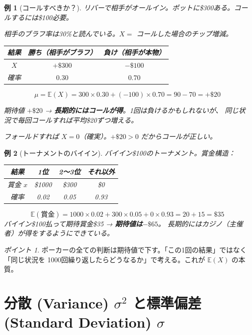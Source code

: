 \documentclass{article}
\newcommand{\E}{\mathbb{E}}
\newtheorem{example}{例}[section]
\theoremstyle{remark}
\newtheorem*{point}{ポイント}
\begin{document}
\begin{example}[コールすべきか？]
  リバーで相手がオールイン。ポットに\$300ある。コールするには\$100必要。

  相手のブラフ率は30\%と読んでいる。$X =$ コールした場合のチップ増減。

  \begin{center}
    \begin{tabular}{c|cc}
      結果 & 勝ち（相手がブラフ） & 負け（相手が本物） \\ \hline
      $X$    & $+\$300$ & $-\$100$ \\
      確率 & $0.30$ & $0.70$
    \end{tabular}
  \end{center}

  \[
    \mu = \E(X) = 300 \times 0.30 + (-100) \times 0.70 = 90 - 70 = +\$20
  \]

  期待値 $+\$20$ → \textbf{長期的にはコールが得}。1回は負けるかもしれないが、
  同じ状況で毎回コールすれば平均\$20ずつ増える。

  フォールドすれば $X = 0$（確実）。$+\$20 > 0$ だからコールが正しい。
\end{example}

\begin{example}[トーナメントのバイイン]
  バイイン\$100のトーナメント。賞金構造：
  \begin{center}
    \begin{tabular}{c|ccc}
      結果 & 1位 & 2〜3位 & それ以外 \\ \hline
      賞金 $x$ & \$1000 & \$300 & \$0 \\
      確率   & 0.02 & 0.05 & 0.93
    \end{tabular}
  \end{center}
  \[
    \E(\text{賞金}) = 1000 \times 0.02 + 300 \times 0.05 + 0 \times 0.93 = 20 + 15 = \$35
  \]
  バイイン\$100払って期待賞金\$35 → \textbf{期待値は$-\$65$}。
  長期的にはカジノ（主催者）が得をするようにできている。
\end{example}

\begin{point}
  ポーカーの全ての判断は期待値で下す。「この1回の結果」ではなく「同じ状況を
  1000回繰り返したらどうなるか」で考える。これが $\E(X)$ の本質。
\end{point}

\section{分散 (Variance) $\sigma^2$ と標準偏差 (Standard Deviation) $\sigma$}
\end{document}
